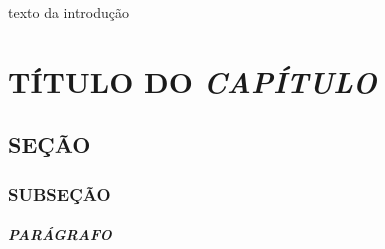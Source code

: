 \documentclass[oneside,12pt]{abntex2}
\begin{document}
texto da introdução



\chapter{TÍTULO DO \textit{CAPÍTULO}}

	\section{SEÇÃO}
	
		\subsection{SUBSEÇÃO}
		
\paragraph{PARÁGRAFO}




\postextual



\end{document}
